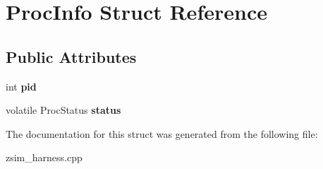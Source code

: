 \hypertarget{structProcInfo}{\section{Proc\-Info Struct Reference}
\label{structProcInfo}
}
\subsection*{Public Attributes}
\begin{DoxyCompactItemize}
\item 
\hypertarget{structProcInfo_a2f6d097d0ab711ee69981a6ba13a9618}{int {\bfseries pid}}\label{structProcInfo_a2f6d097d0ab711ee69981a6ba13a9618}

\item 
\hypertarget{structProcInfo_a8fe7da06d307285c0b4a0686271f9821}{volatile Proc\-Status {\bfseries status}}\label{structProcInfo_a8fe7da06d307285c0b4a0686271f9821}

\end{DoxyCompactItemize}


The documentation for this struct was generated from the following file\-:\begin{DoxyCompactItemize}
\item 
zsim\-\_\-harness.\-cpp\end{DoxyCompactItemize}
